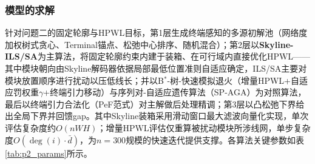 \documentclass{JXUSTmodeling}
\begin{document}
\subsubsection{模型的求解}
针对问题二的固定轮廓与HPWL目标，第1层生成终端感知的多源初解池（网络度加权树式贪心、Terminal锚点、松弛中心排序、随机混合）；第2层以\textbf{Skyline-ILS/SA}为主算法，将固定轮廓约束内建于装箱、在可行域内直接优化HPWL——其中模块朝向由Skyline解码器依据局部最低位置准则自适应确定，ILS/SA主要对模块放置顺序进行扰动以压低线长；并以B${}^{\ast}$-树-快速模拟退火（增量HPWL+自适应罚权重$\gamma$+终端引力移动）与序列对-自适应遗传算法（SP-AGA\cite{murata1995}）为对照算法，最后以终端引力合法化（PeF范式）对主解做后处理精调；第3层以凸松弛下界给出全局下界并回馈gap。其中Skyline装箱采用滑动窗口最大滤波向量化实现，单次评估复杂度约$O(nWH)$；增量HPWL评估仅重算被扰动模块所涉线网，单步复杂度$O(\deg(i)\cdot\bar d)$，为$n=300$规模的快速迭代提供支撑。各算法关键参数如表\ref{tab:p2_params}所示。
\end{document}
